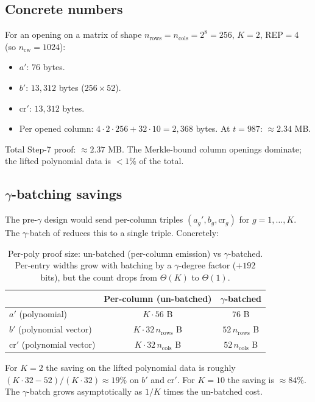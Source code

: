 \subsection{Concrete numbers}

For an opening on a matrix of shape $n_{\mathrm{rows}} =
n_{\mathrm{cols}} = 2^{8} = 256$, $K = 2$, REP$=4$ (so $n_{\mathrm{cw}}
= 1024$):
\begin{itemize}[leftmargin=2em]
  \item $a'$: $76$ bytes.
  \item $b'$: $13{,}312$ bytes ($256 \times 52$).
  \item $\mathrm{cr}'$: $13{,}312$ bytes.
  \item Per opened column: $4 \cdot 2 \cdot 256 + 32 \cdot 10 =
    2{,}368$ bytes. At $t = 987$: $\approx 2.34$ MB.
\end{itemize}
Total Step-7 proof: $\approx 2.37$ MB. The Merkle-bound column openings
dominate; the lifted polynomial data is $< 1\%$ of the total.

\subsection{$\gamma$-batching savings}

The pre-$\gamma$ design would send per-column triples
$(a_g', b_g, \mathrm{cr}_g)$ for $g = 1, \ldots, K$. The $\gamma$-batch
of  reduces this to a single triple. Concretely:

\begin{table}[h]
\centering
\renewcommand{\arraystretch}{1.2}
\begin{tabular}{l c c}
\toprule
& Per-column (un-batched) & $\gamma$-batched \\
\midrule
$a'$ (polynomial) & $K \cdot 56$ B & $76$ B \\
$b'$ (polynomial vector) & $K \cdot 32 \, n_{\mathrm{rows}}$ B & $52 \, n_{\mathrm{rows}}$ B \\
$\mathrm{cr}'$ (polynomial vector) & $K \cdot 32 \, n_{\mathrm{cols}}$ B & $52 \, n_{\mathrm{cols}}$ B \\
\bottomrule
\end{tabular}
\caption{Per-poly proof size: un-batched (per-column emission) vs
$\gamma$-batched. Per-entry widths grow with batching by a
$\gamma$-degree factor ($+192$ bits), but the count drops from
$\Theta(K)$ to $\Theta(1)$.}
\end{table}

For $K = 2$ the saving on the lifted polynomial data is roughly
$(K \cdot 32 - 52) / (K \cdot 32) \approx 19\%$ on $b'$ and $\mathrm{cr}'$.
For $K = 10$ the saving is $\approx 84\%$. The $\gamma$-batch grows
asymptotically as $1/K$ times the un-batched cost.

